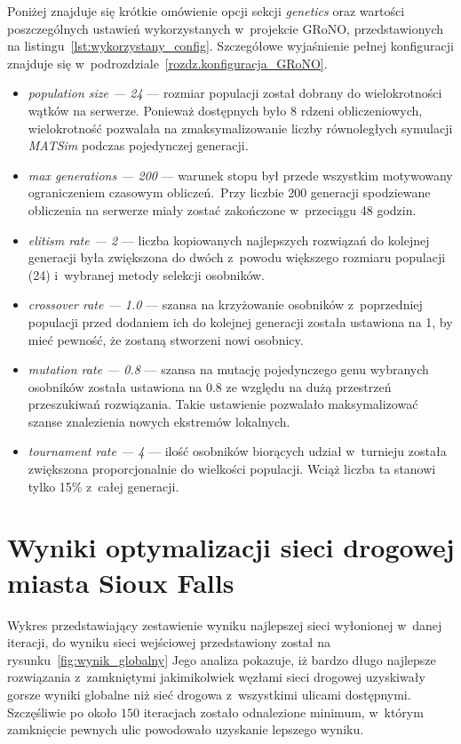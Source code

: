 \documentclass[twoside,12pt]{report}
\begin{document}
Poniżej znajduje się krótkie omówienie opcji sekcji \textit{genetics} oraz wartości poszczególnych ustawień wykorzystanych w~projekcie GRoNO, przedstawionych na listingu~\ref{lst:wykorzystany_config}. Szczegółowe wyjaśnienie pełnej konfiguracji znajduje się w~podrozdziale~\ref{rozdz.konfiguracja_GRoNO}.
\begin{itemize}
\item \textit{population size --- 24} --- rozmiar populacji został dobrany do wielokrotności wątków na serwerze. Ponieważ dostępnych było 8 rdzeni obliczeniowych, wielokrotność pozwalała na zmaksymalizowanie liczby równoległych symulacji \textit{MATSim} podczas pojedynczej generacji.

\item \textit{max generations --- 200} --- warunek stopu był przede wszystkim motywowany ograniczeniem czasowym obliczeń.~Przy liczbie 200 generacji spodziewane obliczenia na serwerze miały zostać zakończone w~przeciągu 48 godzin.

\item \textit{elitism rate --- 2} --- liczba kopiowanych najlepszych rozwiązań do kolejnej generacji była zwiększona do dwóch z~powodu większego rozmiaru populacji (24) i~wybranej metody selekcji osobników.

\item \textit{crossover rate --- 1.0} --- szansa na krzyżowanie osobników z~poprzedniej populacji przed dodaniem ich do kolejnej generacji została ustawiona na 1, by mieć pewność, że zostaną stworzeni nowi osobnicy.

\item \textit{mutation rate --- 0.8} --- szansa na mutację pojedynczego genu wybranych osobników została ustawiona na 0.8 ze względu na dużą przestrzeń przeszukiwań rozwiązania. Takie ustawienie pozwalało maksymalizować szanse znalezienia nowych ekstremów lokalnych.

\item \textit{tournament rate --- 4} --- ilość osobników biorących udział w~turnieju została zwiększona proporcjonalnie do wielkości populacji. Wciąż liczba ta stanowi tylko 15\% z~całej generacji.
\end{itemize}

\section{Wyniki optymalizacji sieci drogowej miasta Sioux Falls}
Wykres przedstawiający zestawienie wyniku najlepszej sieci wyłonionej w~danej iteracji, do wyniku sieci wejściowej przedstawiony został na rysunku~\ref{fig:wynik_globalny} Jego analiza pokazuje, iż bardzo długo najlepsze rozwiązania z~zamkniętymi jakimikolwiek węzłami sieci drogowej uzyskiwały gorsze wyniki globalne niż sieć drogowa z~wszystkimi ulicami dostępnymi. Szczęśliwie po około $150$ iteracjach zostało odnalezione minimum, w~którym zamknięcie pewnych ulic powodowało uzyskanie lepszego wyniku.
\end{document}
